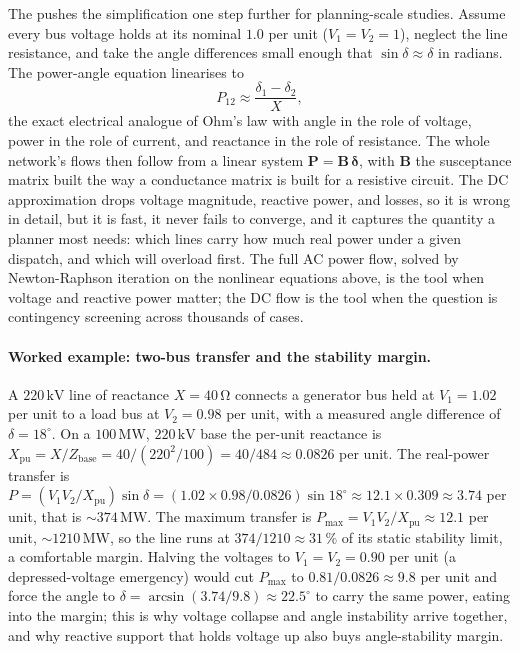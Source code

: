 The  pushes the simplification one step
further for planning-scale studies. Assume every bus voltage holds at its
nominal $1.0$ per unit ($V_1 = V_2 = 1$), neglect the line resistance, and
take the angle differences small enough that $\sin\delta \approx \delta$ in
radians. The power-angle equation linearises to
\[
P_{12} \approx \frac{\delta_1 - \delta_2}{X},
\]
the exact electrical analogue of Ohm's law with angle in the role of voltage,
power in the role of current, and reactance in the role of resistance. The
whole network's flows then follow from a linear system $\mathbf{P} =
\mathbf{B}\,\boldsymbol{\delta}$, with $\mathbf{B}$ the susceptance matrix
built the way a conductance matrix is built for a resistive circuit. The DC
approximation drops voltage magnitude, reactive power, and losses, so it is
wrong in detail, but it is fast, it never fails to converge, and it captures
the quantity a planner most needs: which lines carry how much real power
under a given dispatch, and which will overload first. The full AC power flow,
solved by Newton-Raphson iteration on the nonlinear equations above, is the
tool when voltage and reactive power matter; the DC flow is the tool when the
question is contingency screening across thousands of cases.

\paragraph{Worked example: two-bus transfer and the stability margin.} A
$220\,\si{\kilo\volt}$ line of reactance $X = 40\,\si{\ohm}$ connects a
generator bus held at $V_1 = 1.02$ per unit to a load bus at $V_2 = 0.98$ per
unit, with a measured angle difference of $\delta = 18^\circ$. On a
$100\,\si{\mega\watt}$, $220\,\si{\kilo\volt}$ base the per-unit reactance is
$X_{\text{pu}} = X / Z_{\text{base}} = 40 / (220^2/100) = 40/484 \approx
0.0826$ per unit. The real-power transfer is $P = (V_1 V_2 / X_{\text{pu}})
\sin\delta = (1.02 \times 0.98 / 0.0826)\sin 18^\circ \approx 12.1 \times
0.309 \approx 3.74$ per unit, that is $\sim 374\,\si{\mega\watt}$. The maximum
transfer is $P_{\max} = V_1 V_2 / X_{\text{pu}} \approx 12.1$ per unit, $\sim
1210\,\si{\mega\watt}$, so the line runs at $374/1210 \approx 31\,\%$ of its
static stability limit, a comfortable margin. Halving the voltages to $V_1 =
V_2 = 0.90$ per unit (a depressed-voltage emergency) would cut $P_{\max}$ to
$0.81/0.0826 \approx 9.8$ per unit and force the angle to $\delta =
\arcsin(3.74/9.8) \approx 22.5^\circ$ to carry the same power, eating into the
margin; this is why voltage collapse and angle instability arrive together,
and why reactive support that holds voltage up also buys angle-stability
margin.

